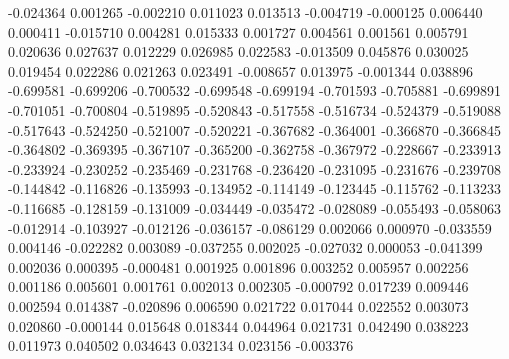 -0.024364
0.001265
-0.002210
0.011023
0.013513
-0.004719
-0.000125
0.006440
0.000411
-0.015710
0.004281
0.015333
0.001727
0.004561
0.001561
0.005791
0.020636
0.027637
0.012229
0.026985
0.022583
-0.013509
0.045876
0.030025
0.019454
0.022286
0.021263
0.023491
-0.008657
0.013975
-0.001344
0.038896
-0.699581
-0.699206
-0.700532
-0.699548
-0.699194
-0.701593
-0.705881
-0.699891
-0.701051
-0.700804
-0.519895
-0.520843
-0.517558
-0.516734
-0.524379
-0.519088
-0.517643
-0.524250
-0.521007
-0.520221
-0.367682
-0.364001
-0.366870
-0.366845
-0.364802
-0.369395
-0.367107
-0.365200
-0.362758
-0.367972
-0.228667
-0.233913
-0.233924
-0.230252
-0.235469
-0.231768
-0.236420
-0.231095
-0.231676
-0.239708
-0.144842
-0.116826
-0.135993
-0.134952
-0.114149
-0.123445
-0.115762
-0.113233
-0.116685
-0.128159
-0.131009
-0.034449
-0.035472
-0.028089
-0.055493
-0.058063
-0.012914
-0.103927
-0.012126
-0.036157
-0.086129
0.002066
0.000970
-0.033559
0.004146
-0.022282
0.003089
-0.037255
0.002025
-0.027032
0.000053
-0.041399
0.002036
0.000395
-0.000481
0.001925
0.001896
0.003252
0.005957
0.002256
0.001186
0.005601
0.001761
0.002013
0.002305
-0.000792
0.017239
0.009446
0.002594
0.014387
-0.020896
0.006590
0.021722
0.017044
0.022552
0.003073
0.020860
-0.000144
0.015648
0.018344
0.044964
0.021731
0.042490
0.038223
0.011973
0.040502
0.034643
0.032134
0.023156
-0.003376

